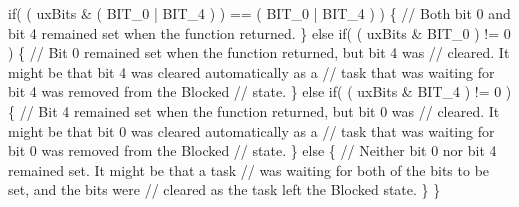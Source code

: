 \begin{DoxyPre}    if( ( uxBits \& ( BIT\_0 | BIT\_4 ) ) == ( BIT\_0 | BIT\_4 ) )
    \{
        // Both bit 0 and bit 4 remained set when the function returned.
    \}
    else if( ( uxBits \& BIT\_0 ) != 0 )
    \{
        // Bit 0 remained set when the function returned, but bit 4 was
        // cleared.  It might be that bit 4 was cleared automatically as a
        // task that was waiting for bit 4 was removed from the Blocked
        // state.
    \}
    else if( ( uxBits \& BIT\_4 ) != 0 )
    \{
        // Bit 4 remained set when the function returned, but bit 0 was
        // cleared.  It might be that bit 0 was cleared automatically as a
        // task that was waiting for bit 0 was removed from the Blocked
        // state.
    \}
    else
    \{
        // Neither bit 0 nor bit 4 remained set.  It might be that a task
        // was waiting for both of the bits to be set, and the bits were
        // cleared as the task left the Blocked state.
    \}
  \}
  \end{DoxyPre}
 
